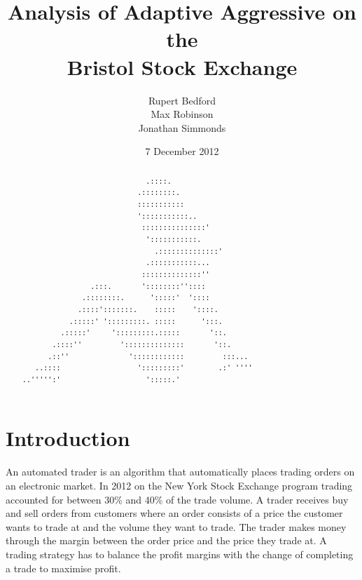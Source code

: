 \documentclass[preprint]{acm_proc_article-sp} %
\begin{document}
\title{Analysis of Adaptive Aggressive on the\\
Bristol Stock Exchange}
\author{
  \alignauthor
    Rupert Bedford\\
  \alignauthor
    Max Robinson\\
  \alignauthor
    Jonathan Simmonds
}
\date{7 December 2012}

\maketitle
\begin{abstract}
\begin{verbatim}
                             .::::. 
                           .::::::::. 
                           ::::::::::: 
                           ':::::::::::.. 
                            :::::::::::::::' 
                             ':::::::::::. 
                               .::::::::::::::' 
                             .:::::::::::... 
                            ::::::::::::::'' 
                .:::.       '::::::::'':::: 
              .::::::::.      ':::::'  ':::: 
             .::::':::::::.    :::::    '::::. 
           .:::::' ':::::::::. :::::      ':::. 
         .:::::'     ':::::::::.:::::       '::. 
       .::::''         '::::::::::::::       '::. 
      .::''              '::::::::::::         :::... 
   ..::::                  ':::::::::'        .:' '''' 
..''''':'                    ':::::.' 
\end{verbatim}
\end{abstract}

\section{Introduction} \label{sec:introduction}

An automated trader is an algorithm that automatically places trading orders on
an electronic market. In 2012 on the New York Stock Exchange program trading accounted for between 
30\% and 40\% of the trade volume\cite{nyse_press}.
A trader receives buy and sell orders from customers where an order consists of a price the customer 
wants to trade at and the volume they want to trade.
The trader makes money through the margin between the order price and the price they trade at.
A trading strategy has to balance the profit margins with the change of completing a trade to maximise profit.
\end{document}
